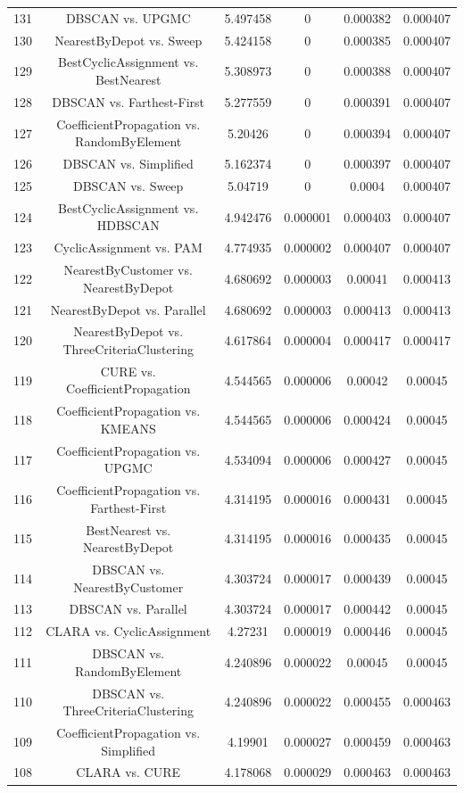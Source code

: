 \documentclass[a4paper,10pt]{article}
\begin{document}
\begin{landscape}
\begin{table}[!htp]
\begin{tabular}{cccccc}
131&DBSCAN vs. UPGMC&5.497458&0&0.000382&0.000407\\
130&NearestByDepot vs. Sweep&5.424158&0&0.000385&0.000407\\
129&BestCyclicAssignment vs. BestNearest&5.308973&0&0.000388&0.000407\\
128&DBSCAN vs. Farthest-First&5.277559&0&0.000391&0.000407\\
127&CoefficientPropagation vs. RandomByElement&5.20426&0&0.000394&0.000407\\
126&DBSCAN vs. Simplified&5.162374&0&0.000397&0.000407\\
125&DBSCAN vs. Sweep&5.04719&0&0.0004&0.000407\\
124&BestCyclicAssignment vs. HDBSCAN&4.942476&0.000001&0.000403&0.000407\\
123&CyclicAssignment vs. PAM&4.774935&0.000002&0.000407&0.000407\\
122&NearestByCustomer vs. NearestByDepot&4.680692&0.000003&0.00041&0.000413\\
121&NearestByDepot vs. Parallel&4.680692&0.000003&0.000413&0.000413\\
120&NearestByDepot vs. ThreeCriteriaClustering&4.617864&0.000004&0.000417&0.000417\\
119&CURE vs. CoefficientPropagation&4.544565&0.000006&0.00042&0.00045\\
118&CoefficientPropagation vs. KMEANS&4.544565&0.000006&0.000424&0.00045\\
117&CoefficientPropagation vs. UPGMC&4.534094&0.000006&0.000427&0.00045\\
116&CoefficientPropagation vs. Farthest-First&4.314195&0.000016&0.000431&0.00045\\
115&BestNearest vs. NearestByDepot&4.314195&0.000016&0.000435&0.00045\\
114&DBSCAN vs. NearestByCustomer&4.303724&0.000017&0.000439&0.00045\\
113&DBSCAN vs. Parallel&4.303724&0.000017&0.000442&0.00045\\
112&CLARA vs. CyclicAssignment&4.27231&0.000019&0.000446&0.00045\\
111&DBSCAN vs. RandomByElement&4.240896&0.000022&0.00045&0.00045\\
110&DBSCAN vs. ThreeCriteriaClustering&4.240896&0.000022&0.000455&0.000463\\
109&CoefficientPropagation vs. Simplified&4.19901&0.000027&0.000459&0.000463\\
108&CLARA vs. CURE&4.178068&0.000029&0.000463&0.000463\\

\end{tabular}
\end{table}
\end{landscape}
\end{document}

